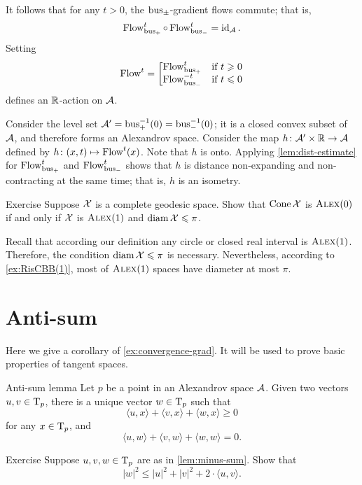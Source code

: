 It follows that for any $t>0$, the $\operatorname{\rm bus}\nolimits_\pm$-gradient flows commute;
that is, 
\[\mathop{\rm Flow}\nolimits_{\operatorname{\rm bus}\nolimits_+}^t\circ\mathop{\rm Flow}\nolimits_{\operatorname{\rm bus}\nolimits_-}^t=\operatorname{\rm id}\nolimits_{\mathcal{A}}.\]
Setting
\[\mathop{\rm Flow}\nolimits^t=\left[\begin{matrix}
\mathop{\rm Flow}\nolimits_{\operatorname{\rm bus}\nolimits_+}^t&\hbox{if}\ t\geqslant0\\
\mathop{\rm Flow}\nolimits_{\operatorname{\rm bus}\nolimits_-}^{-t}&\hbox{if}\ t\leqslant0
               \end{matrix}\right.\]
defines an $\mathbb{R}$-action on $\mathcal{A}$.

Consider the level set $\mathcal{A}'=\operatorname{\rm bus}\nolimits_+^{-1}(0)=\operatorname{\rm bus}\nolimits_-^{-1}(0)$;
it is a closed convex subset of $\mathcal{A}$, and therefore forms an Alexandrov space.
Consider the map $h\colon\mathcal{A}'\times \mathbb{R}\to \mathcal{A}$ defined by $h\colon(x,t)\mapsto \mathop{\rm Flow}\nolimits^t(x)$.
Note that $h$ is onto.
Applying \ref{lem:dist-estimate} for $\mathop{\rm Flow}\nolimits_{\operatorname{\rm bus}\nolimits_+}^t$ and $\mathop{\rm Flow}\nolimits_{\operatorname{\rm bus}\nolimits_-}^t$ shows that $h$ is distance non-expanding and non-contracting at the same time; that is, $h$ is an isometry.
\qeds

\begin{thm}{Exercise}\label{ex:cone-CBB}
Suppose $\mathcal{X}$ is a complete geodesic space.
Show that $\mathop{\rm Cone}\nolimits\mathcal{X}$ is $\textsc{Alex}(0)$ if and only if $\mathcal{X}$ is $\textsc{Alex}(1)$ and $\operatorname{\rm diam}\nolimits\mathcal{X}\leqslant \pi$.
\end{thm}

Recall that according our definition any circle or closed real interval is $\textsc{Alex}(1)$.
Therefore, the condition $\operatorname{\rm diam}\nolimits\mathcal{X}\leqslant \pi$ is necessary.
Nevertheless, according to \ref{ex:RisCBB(1)}, most of $\textsc{Alex}(1)$ spaces have diameter at most $\pi$.

\section{Anti-sum}

Here we give a corollary of \ref{ex:convergence-grad}.
It will be used to prove basic properties of  tangent spaces.


\begin{thm}{Anti-sum lemma}\label{lem:minus-sum} 
Let $p$ be a point in an Alexandrov space $\mathcal{A}$.
Given two vectors $u,v\in \mathrm{T}_p$, there is a unique vector $w\in \mathrm{T}_p$ such that
\[\langle u,x\rangle +\langle v,x\rangle +\langle w,x\rangle \ge 0\]
for any $x\in \mathrm{T}_p$, and
\[\langle u,w\rangle +\langle v,w\rangle +\langle w,w\rangle =0.\]

\end{thm}

\begin{thm}{Exercise}\label{ex:|antisum|}
Suppose $u,v, w\in \mathrm{T}_p$ are as in \ref{lem:minus-sum}.
Show that 
\[|w|^2\le |u|^2+|v|^2+2\cdot\langle u,v\rangle.\]

\end{thm}

